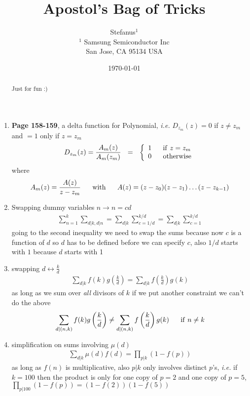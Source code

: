 \documentclass[aps,preprint,preprintnumbers,nofootinbib,showpacs,prd]{revtex4-1}
\newcommand{\ie}{{\it i.e.} }
\newcommand{\nbea}{\begin{eqnarray*}}
\newcommand{\neea}{\end{eqnarray*}}
\begin{document}
\title{Apostol's Bag of Tricks}
\bigskip
\author{Stefanus$^1$\\
$^1$ Samsung Semiconductor Inc\\ San Jose, CA 95134 USA\\
}
%
\date{\today}
%
\begin{abstract}
Just for fun :)

\end{abstract}
%
\maketitle

\renewcommand{\theequation}{A.\arabic{equation}}  %
\setcounter{equation}{0}  %

\begin{enumerate}
\item {\bf Page 158-159}, a delta function for Polynomial, \ie $D_{z_m}(z) = 0$ if $z\neq z_m$ and $=1$ only if $z=z_m$
%
\nbea
D_{z_m}(z) = \frac{A_m(z)}{A_m(z_m)} ~~=~~  \left \{
\begin{array}{l }
1 ~~~~~{\rm if~} z = z_m \\
0 ~~~~~{\rm otherwise}
\end{array}
 \right .
\neea
%
where
%
\nbea
A_m(z) = \frac{A(z)}{z - z_m} ~~~~~ {\rm with} ~~~~~ A(z) = (z-z_0)(z-z_1) \dots (z-z_{k-1})
\neea
%

\item Swapping dummy variables $n \to n = cd$
%
\nbea
\sum_{n=1}^k \sum_{d|k, d|n} = \sum_{d|k} \sum_{c=1/d}^{k/d} = \sum_{d|k} \sum_{c=1}^{k/d}
\neea
%
going to the second inequality we need to swap the sums because now $c$ is a function of $d$ so $d$ has to be defined before we can specify $c$, also $1/d$ starts with $1$ because $d$ starts with 1

\item swapping $d \leftrightarrow \frac{k}{d}$
%
\nbea
\sum_{d|k} f(k) g\left(\frac{k}{d}\right) = \sum_{d|k} f\left(\frac{k}{d}\right) g(k)
\neea
%
as long as we sum over {\it all} divisors of $k$ if we put another constraint we can't do the above
%
\nbea
\sum_{d|(n,k)} f(k) g\left(\frac{k}{d}\right) \neq \sum_{d|(n,k)} f\left(\frac{k}{d}\right) g(k) ~~~~~ {\rm if} ~ n \neq k
\neea
%

\item simplification on sums involving $\mu(d)$
%
\nbea
\sum_{d|k} \mu(d) f(d) = \prod_{p|k} \left(1 - f(p)\right)
\neea
%
as long as $f(n)$ is multiplicative, also $p|k$ only involves distinct $p$'s, \ie if $k=100$ then the product is only for one copy of $p = 2$ and one copy of $p = 5$, $\prod_{p|100} \left(1 - f(p)\right) = (1 - f(2))(1 - f(5))$


\end{enumerate}
\end{document}
